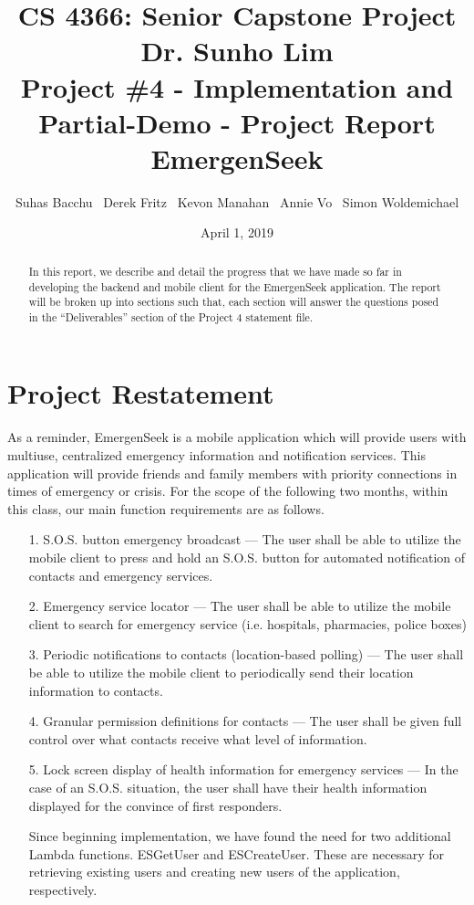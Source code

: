 \documentclass[10pt, a4paper]{article}
\title{\large CS 4366: Senior Capstone Project \\ Dr. Sunho Lim \\ Project \#4 - Implementation and Partial-Demo - Project Report \\ EmergenSeek}
\author{Suhas Bacchu \ Derek Fritz \ Kevon Manahan \ Annie Vo \ Simon Woldemichael}
\date{April 1, 2019}
\begin{document}
\maketitle
\vspace{-1cm}
\begin{abstract}
In this report, we describe and detail the progress that we have made so far in developing the backend and mobile client for the EmergenSeek application. The report will be broken up into sections such that, each section will answer the questions posed in the ``Deliverables'' section of the Project 4 statement file.
\end{abstract}

\section{Project Restatement} 
\label{sec:pr}
As a reminder, EmergenSeek is a mobile application which will provide users with multiuse, centralized emergency information and notification services. This application will provide friends and family members with priority connections in times of emergency or crisis. For the scope of the following two months, within this class, our main function requirements are as follows.
\begin{enumerate}
	\item[1.] S.O.S. button emergency broadcast --- The user shall be able to utilize the mobile client to press and hold an S.O.S. button for automated notification of contacts and emergency services.
	\item[2.] Emergency service locator --- The user shall be able to utilize the mobile client to search for emergency service (i.e. hospitals, pharmacies, police boxes)
	\item[3.] Periodic notifications to contacts (location-based polling) --- The user shall be able to utilize the mobile client to periodically send their location information to contacts.
	\item[4.] Granular permission definitions for contacts --- The user shall be given full control over what contacts receive what level of information.
	\item[5.] Lock screen display of health information for emergency services --- In the case of an S.O.S. situation, the user shall have their health information displayed for the convince of first responders.
	
Since beginning implementation, we have found the need for two additional Lambda functions. ESGetUser and ESCreateUser. These are necessary for retrieving existing users and creating new users of the application, respectively.
\end{enumerate}
\end{document}
